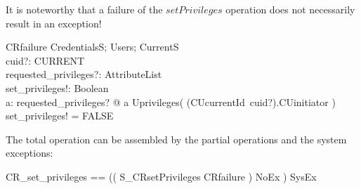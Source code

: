 It is noteworthy that a failure of the $setPrivileges$ operation does not
necessarily result in an exception!
\begin{schema}{CRfailure}
  \Xi CredentialsS; \Xi Users; \Xi CurrentS \\
  cuid?: CURRENT \\
  requested\_privileges?: AttributeList \\
  set\_privileges!: Boolean \\
  \where
  \forall a: \ran requested\_privileges? @ a \notin Uprivileges(
  (CUcurrentId~cuid?).CUinitiator ) \\
  set\_privileges! = FALSE \\
\end{schema}
The total operation can be assembled by the partial operations and the system
exceptions:
\begin{zed}
  CR\_set\_privileges == (( S\_CRsetPrivileges \lor CRfailure ) \land NoEx )
  \lor SysEx \\
\end{zed}


